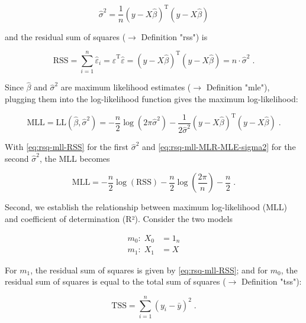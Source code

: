 \documentclass[a4paper,12pt]{book}
\begin{document}
\begin{equation} \label{eq:rsq-mll-MLR-MLE-sigma2}
\hat{\sigma}^2 = \frac{1}{n} (y - X\hat{\beta})^\mathrm{T} (y - X\hat{\beta})
\end{equation}

and the residual sum of squares ($\rightarrow$ Definition "rss") is

\begin{equation} \label{eq:rsq-mll-RSS}
\mathrm{RSS} = \sum_{i=1}^n \hat{\varepsilon}_i = \hat{\varepsilon}^\mathrm{T} \hat{\varepsilon} = (y - X\hat{\beta})^\mathrm{T} (y - X\hat{\beta}) = n \cdot \hat{\sigma}^2 \; .
\end{equation}

Since $\hat{\beta}$ and $\hat{\sigma}^2$ are maximum likelihood estimates ($\rightarrow$ Definition "mle"), plugging them into the log-likelihood function gives the maximum log-likelihood:

\begin{equation} \label{eq:rsq-mll-MLR-MLL}
\mathrm{MLL} = \mathrm{LL}(\hat{\beta},\hat{\sigma}^2) = - \frac{n}{2} \log(2\pi\hat{\sigma}^2) - \frac{1}{2\hat{\sigma}^2} (y - X\hat{\beta})^\mathrm{T} (y - X\hat{\beta}) \; .
\end{equation}

With \eqref{eq:rsq-mll-RSS} for the first $\hat{\sigma}^2$ and \eqref{eq:rsq-mll-MLR-MLE-sigma2} for the second $\hat{\sigma}^2$, the MLL becomes

\begin{equation} \label{eq:rsq-mll-MLR-MLL-RSS}
\mathrm{MLL} = - \frac{n}{2} \log(\mathrm{RSS}) - \frac{n}{2} \log \left( \frac{2\pi}{n} \right) - \frac{n}{2} \; .
\end{equation}

Second, we establish the relationship between maximum log-likelihood (MLL) and coefficient of determination (R²). Consider the two models

\begin{equation} \label{eq:rsq-mll-m0-m1}
\begin{split}
m_0: \; X_0 &= 1_n \\
m_1: \; X_1 &= X
\end{split}
\end{equation}

For $m_1$, the residual sum of squares is given by \eqref{eq:rsq-mll-RSS}; and for $m_0$, the residual sum of squares is equal to the total sum of squares ($\rightarrow$ Definition "tss"):

\begin{equation} \label{eq:rsq-mll-TSS}
\mathrm{TSS} = \sum_{i=1}^n (y_i - \bar{y})^2 \; .
\end{equation}
\end{document}
